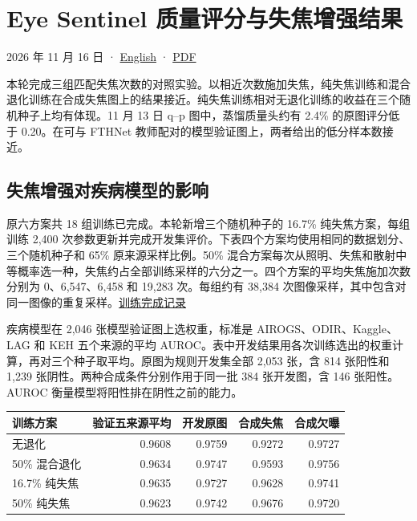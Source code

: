\documentclass[
  11pt,
]{article}
\author{}
\date{}
\newcounter{none} %
\begin{document}
\renewcommand{\figurename}{图}

\section{Eye Sentinel
质量评分与失焦增强结果}\label{eye-sentinel-ux8d28ux91cfux8bc4ux5206ux4e0eux5931ux7126ux589eux5f3aux7ed3ux679c}

2026 年 11 月 16 日 · \href{quality-alignment.en.md}{English} ·
\href{quality-alignment.zh.pdf}{PDF}

本轮完成三组匹配失焦次数的对照实验。以相近次数施加失焦，纯失焦训练和混合退化训练在合成失焦图上的结果接近。纯失焦训练相对无退化训练的收益在三个随机种子上均有体现。11
月 13 日 q--p 图中，蒸馏质量头约有 2.4\% 的原图评分低于 0.20。在可与
FTHNet 教师配对的模型验证图上，两者给出的低分样本数接近。

\subsection{失焦增强对疾病模型的影响}\label{ux5931ux7126ux589eux5f3aux5bf9ux75beux75c5ux6a21ux578bux7684ux5f71ux54cd}

原六方案共 18 组训练已完成。本轮新增三个随机种子的 16.7\%
纯失焦方案，每组训练 2,400
次参数更新并完成开发集评价。下表四个方案均使用相同的数据划分、三个随机种子和
65\% 原来源采样比例。50\%
混合方案每次从照明、失焦和散射中等概率选一种，失焦约占全部训练采样的六分之一。四个方案的平均失焦施加次数分别为
0、6,547、6,458 和 19,283 次。每组约有 38,384
次图像采样，其中包含对同一图像的重复采样。\href{../../../runs/followup_20261115/matched_defocus/status.json}{训练完成记录}

疾病模型在 2,046 张模型验证图上选权重，标准是 AIROGS、ODIR、Kaggle、LAG
和 KEH 五个来源的平均
AUROC。表中开发结果用各次训练选出的权重计算，再对三个种子取平均。原图为规则开发集全部
2,053 张，含 814 张阳性和 1,239 张阴性。两种合成条件分别作用于同一批 384
张开发图，含 146 张阳性。AUROC 衡量模型将阳性排在阴性之前的能力。

{\def\LTcaptype{none} %
\begin{longtable}[]{@{}lrrrr@{}}
\toprule\noalign{}
训练方案 & 验证五来源平均 & 开发原图 & 合成失焦 & 合成欠曝 \\
\midrule\noalign{}
\endhead
\bottomrule\noalign{}
\endlastfoot
无退化 & 0.9608 & 0.9759 & 0.9272 & 0.9727 \\
50\% 混合退化 & 0.9634 & 0.9747 & 0.9593 & 0.9756 \\
16.7\% 纯失焦 & 0.9635 & 0.9727 & 0.9628 & 0.9741 \\
50\% 纯失焦 & 0.9623 & 0.9742 & 0.9676 & 0.9720 \\
\end{longtable}
}
\end{document}
